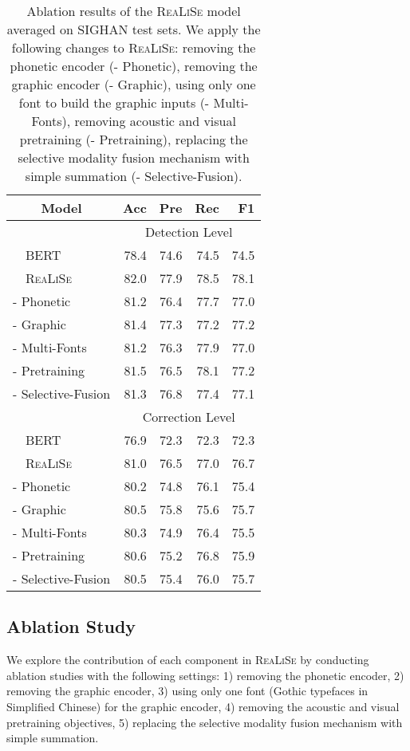 \documentclass[11pt,a4paper]{article}
\newcommand\model{\textsc{ReaLiSe}}
\begin{document}
\begin{table}[t]
\small
\centering

\begin{tabular}{@{}l|rrrr@{}}
\toprule
\multicolumn{1}{c|}{Model} & Acc & Pre & Rec & F1 \\
\midrule
& \multicolumn{4}{c}{Detection Level} \\
\midrule
~~BERT & 78.4 & 74.6 & 74.5 & 74.5 \\
~~\model{} & 82.0 & 77.9 & 78.5 & 78.1 \\
\quad - Phonetic & 81.2 & 76.4 & 77.7 & 77.0 \\
\quad - Graphic & 81.4 & 77.3 & 77.2 & 77.2 \\
\quad - Multi-Fonts & 81.2 & 76.3 & 77.9 & 77.0 \\
\quad - Pretraining & 81.5 & 76.5 & 78.1 & 77.2 \\
\quad - Selective-Fusion & 81.3 & 76.8 & 77.4 & 77.1 \\ 
\midrule
& \multicolumn{4}{c}{Correction Level} \\
\midrule
~~BERT & 76.9 & 72.3 & 72.3 & 72.3 \\
~~\model{} & 81.0 & 76.5 & 77.0 & 76.7 \\
\quad - Phonetic & 80.2 & 74.8 & 76.1 & 75.4 \\
\quad - Graphic & 80.5 & 75.8 & 75.6 & 75.7 \\
\quad - Multi-Fonts & 80.3 & 74.9 & 76.4 & 75.5 \\
\quad - Pretraining & 80.6 & 75.2 & 76.8 & 75.9 \\
\quad - Selective-Fusion & 80.5 & 75.4 & 76.0 & 75.7 \\ 
\bottomrule
\end{tabular}

\caption{Ablation results of the \model{} model averaged on SIGHAN test sets. We apply the following changes to \model{}: removing the phonetic encoder (- Phonetic), removing the graphic encoder (- Graphic),  using only one font to build the graphic inputs (- Multi-Fonts), removing acoustic and visual pretraining (- Pretraining), replacing the selective modality fusion mechanism with simple summation (- Selective-Fusion).}
\label{tab:ablation}
\end{table} 

\subsection{Ablation Study}

We explore the contribution of each component in \model{} by conducting ablation studies with the following settings: 1) removing the phonetic encoder, 2) removing the graphic encoder, 3) using only one font (Gothic typefaces in Simplified Chinese) for the graphic encoder, 4) removing the acoustic and visual pretraining objectives, 5) replacing the selective modality fusion mechanism with simple summation. 
\end{document}

